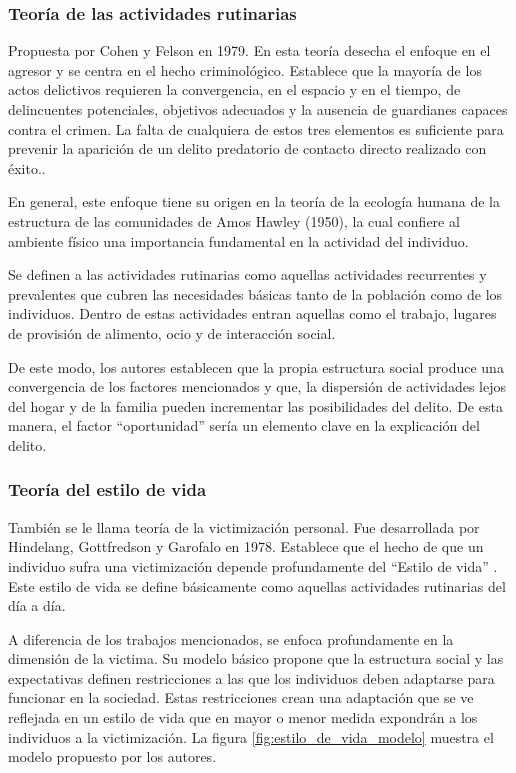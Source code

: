 \subsubsection{Teoría de las actividades rutinarias}
Propuesta por Cohen y Felson en 1979. En esta teoría desecha el enfoque en el agresor y se centra en el hecho criminológico. Establece que la mayoría de los actos delictivos requieren la convergencia, en el espacio y en el tiempo, de delincuentes potenciales, objetivos adecuados y la ausencia de guardianes capaces contra el crimen. La falta de cualquiera de estos tres elementos es suficiente para prevenir la aparición de un delito predatorio de contacto directo realizado con éxito.\cite{cohenfelson1979}.

En general, este enfoque tiene su origen en la teoría de la ecología humana de la estructura de las comunidades de Amos Hawley (1950), la cual confiere al ambiente físico una importancia fundamental en la actividad del individuo\cite{canopanos2018}.

Se definen a las actividades rutinarias como aquellas actividades recurrentes y prevalentes que cubren las necesidades básicas tanto de la población como de los individuos\cite{cohenfelson1979}. Dentro de estas actividades entran aquellas como el trabajo, lugares de provisión de alimento, ocio y de interacción social. 

De este modo, los autores establecen que la propia estructura social produce una convergencia de los factores mencionados y que, la dispersión de actividades lejos del hogar y de la familia pueden incrementar las posibilidades del delito\cite{cohenfelson1979}. De esta manera, el factor \enquote{oportunidad}  sería un elemento clave en la explicación del delito\cite{canopanos2018}.

\subsubsection{Teoría del estilo de vida}
También se le llama teoría de la victimización personal. Fue desarrollada por Hindelang, Gottfredson y Garofalo en 1978. Establece que el hecho de que un individuo sufra una victimización depende profundamente del \enquote{Estilo de vida} \cite{hindelang1978}. Este estilo de vida se define básicamente como aquellas actividades rutinarias del día a día.

A diferencia de los trabajos mencionados, se enfoca profundamente en la dimensión de la victima. Su modelo básico propone que la estructura social y las expectativas definen restricciones a las que los individuos deben adaptarse para funcionar en la sociedad\cite{hindelang1978}. Estas restricciones crean una adaptación que se ve reflejada en un estilo de vida que en mayor o menor medida expondrán a los individuos a la victimización. La figura \ref{fig:estilo_de_vida_modelo} muestra el modelo propuesto por los autores.

